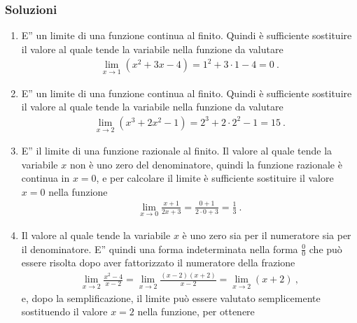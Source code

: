 \documentclass[letterpaper,10pt,italian]{jupyterBook}
\begin{document}
\subsubsection*{Soluzioni}
\begin{enumerate}
%
\item {} 
\sphinxAtStartPar
E” un limite di una funzione continua al finito. Quindi è sufficiente sostituire il valore al quale tende la variabile nella funzione da valutare
\begin{equation*}
\begin{split}\lim_{x \to 1} (x^2 + 3x - 4) = 1^2 + 3 \cdot 1 - 4 = 0 \ .\end{split}
\end{equation*}
\item {} 
\sphinxAtStartPar
E” un limite di una funzione continua al finito. Quindi è sufficiente sostituire il valore al quale tende la variabile nella funzione da valutare
\begin{equation*}
\begin{split}\lim_{x \to 2} (x^3 + 2x^2 - 1) = 2^3 + 2 \cdot 2^2 - 1 = 15 \ .\end{split}
\end{equation*}
\item {} 
\sphinxAtStartPar
E” il limite di una funzione razionale al finito. Il valore al quale tende la variabile \(x\) non è uno zero del denominatore, quindi la funzione razionale è continua in \(x = 0\), e per calcolare il limite è sufficiente sostituire il valore \(x=0\) nella funzione
\begin{equation*}
\begin{split}\lim_{x \to 0} \frac{x + 1}{2x + 3} = \frac{0+1}{2\cdot 0 + 3} = \frac{1}{3} \ .\end{split}
\end{equation*}
\item {} 
\sphinxAtStartPar
Il valore al quale tende la variabile \(x\) è uno zero sia per il numeratore sia per il denominatore. E” quindi una forma indeterminata nella forma \(\frac{0}{0}\) che può essere risolta dopo aver fattorizzato il numeratore della frazione
\begin{equation*}
\begin{split}\lim_{x \to 2} \frac{x^2 - 4}{x-2} = \lim_{x \to 2} \frac{(x-2)(x+2)}{x-2} = \lim_{x \to 2} (x+2) \ ,\end{split}
\end{equation*}
\sphinxAtStartPar
e, dopo la semplificazione, il limite può essere valutato semplicemente sostituendo il valore \(x=2\) nella funzione, per ottenere

\end{enumerate}
\end{document}
